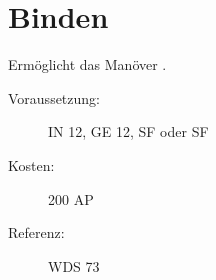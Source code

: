 \section{Binden}
\label{sf.binden}
Ermöglicht das Manöver .
\begin{description}
    \item[Voraussetzung:]
        IN 12, GE 12, SF  oder SF 
    \item [Kosten:]
        200 AP
    \item [Referenz:]
        WDS 73
\end{description}
